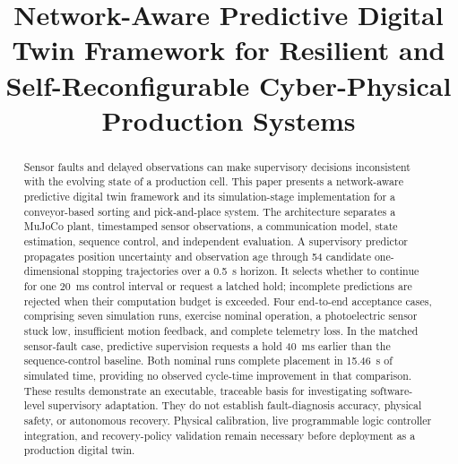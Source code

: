 \title{Network-Aware Predictive Digital Twin Framework for Resilient and Self-Reconfigurable Cyber-Physical Production Systems}
\author{\mbox{}}
\authorrunning{}
\institute{\mbox{}}
\maketitle

\begin{abstract}
Sensor faults and delayed observations can make supervisory decisions inconsistent with the evolving state of a production cell. This paper presents a network-aware predictive digital twin framework and its simulation-stage implementation for a conveyor-based sorting and pick-and-place system. The architecture separates a MuJoCo plant, timestamped sensor observations, a communication model, state estimation, sequence control, and independent evaluation. A supervisory predictor propagates position uncertainty and observation age through 54 candidate one-dimensional stopping trajectories over a 0.5~s horizon. It selects whether to continue for one 20~ms control interval or request a latched hold; incomplete predictions are rejected when their computation budget is exceeded. Four end-to-end acceptance cases, comprising seven simulation runs, exercise nominal operation, a photoelectric sensor stuck low, insufficient motion feedback, and complete telemetry loss. In the matched sensor-fault case, predictive supervision requests a hold 40~ms earlier than the sequence-control baseline. Both nominal runs complete placement in 15.46~s of simulated time, providing no observed cycle-time improvement in that comparison. These results demonstrate an executable, traceable basis for investigating software-level supervisory adaptation. They do not establish fault-diagnosis accuracy, physical safety, or autonomous recovery. Physical calibration, live programmable logic controller integration, and recovery-policy validation remain necessary before deployment as a production digital twin.
\end{abstract}
